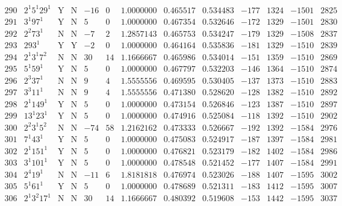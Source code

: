 \documentclass[11pt,reqno,a4letter]{article}
\numberwithin{equation}{section}
\numberwithin{figure}{section}
\numberwithin{table}{section}
\theoremstyle{plain}
\numberwithin{theorem}{section}
\theoremstyle{definition}
\begin{document}
\begin{table}[ht]
\begin{equation*}
{\begin{array}{cc|cc|ccc|cc|cccc}
 290 & 2^1 5^1 29^1 & \text{Y} & \text{N} & -16 & 0 & 1.0000000 & 0.465517 & 0.534483 & -177 & 1324 & -1501 & 2825 \\
 291 & 3^1 97^1 & \text{Y} & \text{N} & 5 & 0 & 1.0000000 & 0.467354 & 0.532646 & -172 & 1329 & -1501 & 2830 \\
 292 & 2^2 73^1 & \text{N} & \text{N} & -7 & 2 & 1.2857143 & 0.465753 & 0.534247 & -179 & 1329 & -1508 & 2837 \\
 293 & 293^1 & \text{Y} & \text{Y} & -2 & 0 & 1.0000000 & 0.464164 & 0.535836 & -181 & 1329 & -1510 & 2839 \\
 294 & 2^1 3^1 7^2 & \text{N} & \text{N} & 30 & 14 & 1.1666667 & 0.465986 & 0.534014 & -151 & 1359 & -1510 & 2869 \\
 295 & 5^1 59^1 & \text{Y} & \text{N} & 5 & 0 & 1.0000000 & 0.467797 & 0.532203 & -146 & 1364 & -1510 & 2874 \\
 296 & 2^3 37^1 & \text{N} & \text{N} & 9 & 4 & 1.5555556 & 0.469595 & 0.530405 & -137 & 1373 & -1510 & 2883 \\
 297 & 3^3 11^1 & \text{N} & \text{N} & 9 & 4 & 1.5555556 & 0.471380 & 0.528620 & -128 & 1382 & -1510 & 2892 \\
 298 & 2^1 149^1 & \text{Y} & \text{N} & 5 & 0 & 1.0000000 & 0.473154 & 0.526846 & -123 & 1387 & -1510 & 2897 \\
 299 & 13^1 23^1 & \text{Y} & \text{N} & 5 & 0 & 1.0000000 & 0.474916 & 0.525084 & -118 & 1392 & -1510 & 2902 \\
 300 & 2^2 3^1 5^2 & \text{N} & \text{N} & -74 & 58 & 1.2162162 & 0.473333 & 0.526667 & -192 & 1392 & -1584 & 2976 \\
 301 & 7^1 43^1 & \text{Y} & \text{N} & 5 & 0 & 1.0000000 & 0.475083 & 0.524917 & -187 & 1397 & -1584 & 2981 \\
 302 & 2^1 151^1 & \text{Y} & \text{N} & 5 & 0 & 1.0000000 & 0.476821 & 0.523179 & -182 & 1402 & -1584 & 2986 \\
 303 & 3^1 101^1 & \text{Y} & \text{N} & 5 & 0 & 1.0000000 & 0.478548 & 0.521452 & -177 & 1407 & -1584 & 2991 \\
 304 & 2^4 19^1 & \text{N} & \text{N} & -11 & 6 & 1.8181818 & 0.476974 & 0.523026 & -188 & 1407 & -1595 & 3002 \\
 305 & 5^1 61^1 & \text{Y} & \text{N} & 5 & 0 & 1.0000000 & 0.478689 & 0.521311 & -183 & 1412 & -1595 & 3007 \\
 306 & 2^1 3^2 17^1 & \text{N} & \text{N} & 30 & 14 & 1.1666667 & 0.480392 & 0.519608 & -153 & 1442 & -1595 & 3037 \\

\end{array}}
\end{equation*}
\end{table}
\end{document}
